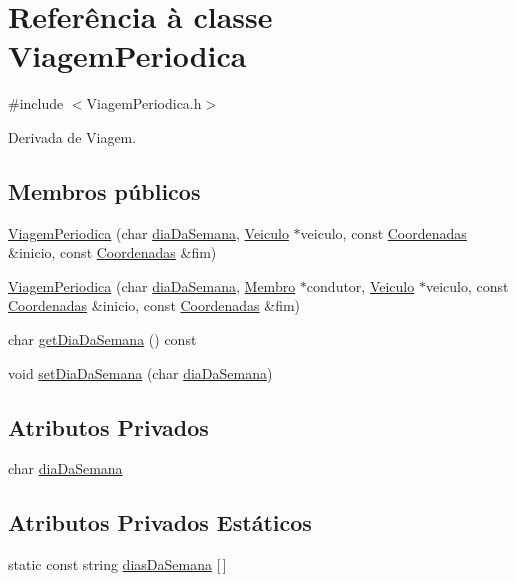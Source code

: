 \hypertarget{class_viagem_periodica}{\section{Referência à classe Viagem\+Periodica}
\label{class_viagem_periodica}
}


{\ttfamily \#include $<$Viagem\+Periodica.\+h$>$}



Derivada de Viagem.

\subsection*{Membros públicos}
\begin{DoxyCompactItemize}
\item 
\hyperlink{class_viagem_periodica_aac7574ed67f67dad6d16751c2d024670}{Viagem\+Periodica} (char \hyperlink{class_viagem_periodica_ac53255ef9f3e6d862e2ac803d7e45206}{dia\+Da\+Semana}, \hyperlink{class_veiculo}{Veiculo} $\ast$veiculo, const \hyperlink{class_coordenadas}{Coordenadas} \&inicio, const \hyperlink{class_coordenadas}{Coordenadas} \&fim)
\item 
\hyperlink{class_viagem_periodica_a13fc61d10fe1d8f3ced8e7f9557c2553}{Viagem\+Periodica} (char \hyperlink{class_viagem_periodica_ac53255ef9f3e6d862e2ac803d7e45206}{dia\+Da\+Semana}, \hyperlink{class_membro}{Membro} $\ast$condutor, \hyperlink{class_veiculo}{Veiculo} $\ast$veiculo, const \hyperlink{class_coordenadas}{Coordenadas} \&inicio, const \hyperlink{class_coordenadas}{Coordenadas} \&fim)
\item 
char \hyperlink{class_viagem_periodica_a18ccdd2f58dd4fbf3dc95e1927a61af7}{get\+Dia\+Da\+Semana} () const 
\item 
void \hyperlink{class_viagem_periodica_a1351abcca608d827c5c4eb7ba2f45e14}{set\+Dia\+Da\+Semana} (char \hyperlink{class_viagem_periodica_ac53255ef9f3e6d862e2ac803d7e45206}{dia\+Da\+Semana})
\end{DoxyCompactItemize}
\subsection*{Atributos Privados}
\begin{DoxyCompactItemize}
\item 
char \hyperlink{class_viagem_periodica_ac53255ef9f3e6d862e2ac803d7e45206}{dia\+Da\+Semana}
\end{DoxyCompactItemize}
\subsection*{Atributos Privados Estáticos}
\begin{DoxyCompactItemize}
\item 
static const string \hyperlink{class_viagem_periodica_aec0deb1571c96da485be2d49e85d48a6}{dias\+Da\+Semana} \mbox{[}$\,$\mbox{]}
\end{DoxyCompactItemize}


